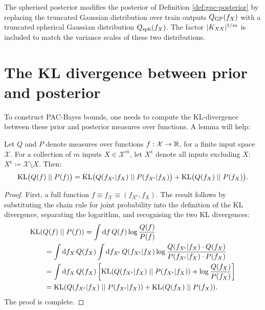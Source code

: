 \begin{refsection}
The spherised posterior modifies the posterior of Definition \ref{def:gpc-posterior} by replacing the truncated Gaussian distribution over train outputs $Q_\mathrm{GP}(f_X)$ with a truncated spherical Gaussian distribution $Q_\mathrm{sph}(f_X)$. The factor $\vert {K_{XX}} \vert^{1/m}$ is included to match the variance scales of these two distributions.

\section{The KL divergence between prior and posterior}\label{sec:kl}

To construct PAC-Bayes bounds, one needs to compute the KL-divergence between these prior and posterior measures over functions. A lemma will help:
\begin{lemma}\label{lem:kl-chain} Let $Q$ and $P$ denote measures over functions $f:\mathcal{X}\to\mathbb{R}$, for a finite input space $\mathcal{X}$. For a collection of $m$ inputs $X\in\mathcal{X}^m$, let $X^\mathsf{c}$ denote all inputs excluding $X$: $X^\mathsf{c}\coloneqq \mathcal{X}\setminus X$. Then:
    \begin{align}
        \mathrm{KL}\big(Q(f)\;||\;P(f)\big) = \mathrm{KL}\big(Q(f_{X^\mathsf{c}} | f_X)\;||\;P(f_{X^\mathsf{c}}|f_X)\big) + \mathrm{KL}\big(Q(f_X)\;||\;P(f_X)\big).
    \end{align}
\end{lemma}
\begin{proof}
First, a full function $f \equiv f_\mathcal{X} \equiv (f_{X^\mathsf{c}},f_X)$. The result follows by substituting the chain rule for joint probability into the definition of the KL divergence, separating the logarithm, and recognising the two KL divergences:
    \begin{align*}
    &\mathrm{KL}(Q(f)\;||\;P(f)) = \int \mathrm{d}{f}\,Q(f) \log \frac{Q(f)}{P(f)}\\
    & \qquad= \int\mathrm{d}{f_X}\, Q(f_X)\int \mathrm{d}{f_{X^\mathsf{c}}}\,Q(f_{X^\mathsf{c}}|f_X) \log \frac{Q(f_{X^\mathsf{c}}|f_X)\cdot Q(f_X)}{P(f_{X^\mathsf{c}}|f_X)\cdot P(f_X)}\\
    & \qquad= \int\mathrm{d}{f_X}\,Q(f_X) \left[\mathrm{KL}(Q(f_{X^\mathsf{c}} | f_X)\;||\;P(f_{X^\mathsf{c}}| f_X)) + \log \frac{Q(f_X)}{P(f_X)}\right]\\
    & \qquad = \mathrm{KL}(Q(f_{X^\mathsf{c}} | f_X)\;||\;P(f_{X^\mathsf{c}}| f_X)) + \mathrm{KL}(Q(f_X)\;||\;P(f_X)).
    \end{align*}
    The proof is complete.
\end{proof}


\end{refsection}
